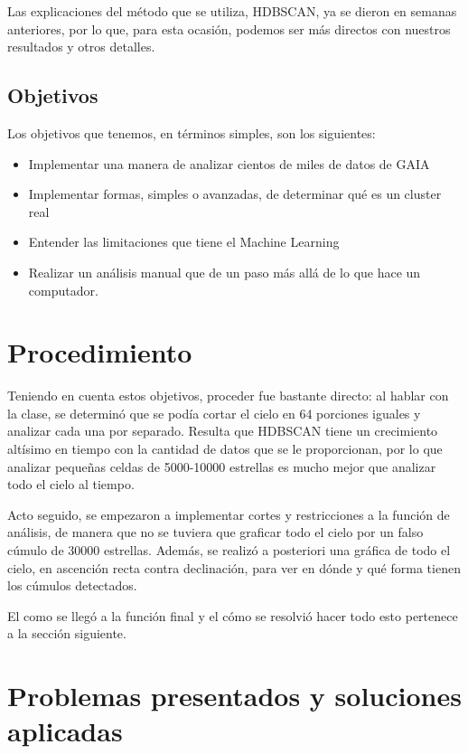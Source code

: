 \documentclass[10pt,twocolumn]{article}
\begin{document}
Las explicaciones del método que se utiliza, HDBSCAN, ya se dieron en semanas anteriores, por lo que, 
para esta ocasión, podemos ser más directos con nuestros resultados y otros detalles. 
\subsection{Objetivos}

Los objetivos que tenemos, en términos simples, son los siguientes:
\begin{itemize}
    \item Implementar una manera de analizar cientos de miles de datos de GAIA
    \item Implementar formas, simples o avanzadas, de determinar qué es un cluster real
    \item Entender las limitaciones que tiene el Machine Learning 
    \item Realizar un análisis manual que de un paso más allá de lo que hace un computador.
\end{itemize}

\section{Procedimiento}

Teniendo en cuenta estos objetivos, proceder fue bastante directo: al hablar con la clase, se determinó 
que se podía cortar el cielo en 64 porciones iguales y analizar cada una por separado. Resulta que
HDBSCAN tiene un crecimiento altísimo en tiempo con la cantidad de datos que se le proporcionan, por lo que
analizar pequeñas celdas de 5000-10000 estrellas es mucho mejor que analizar todo el cielo al tiempo. 

Acto seguido, se empezaron a implementar cortes y restricciones a la función de análisis, de manera que 
no se tuviera que graficar todo el cielo por un falso cúmulo de 30000 estrellas. Además, se realizó a posteriori
una gráfica de todo el cielo, en ascención recta contra declinación, para ver en dónde y qué forma tienen los 
cúmulos detectados. 

El como se llegó a la función final y el cómo se resolvió hacer todo esto pertenece a la sección siguiente.

\section{Problemas presentados y soluciones aplicadas}
\end{document}
